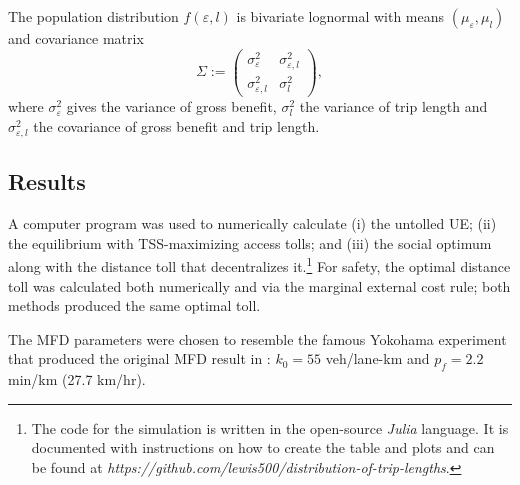 \documentclass[preprint,authoryear]{elsarticle}
\newcommand{\ve}{\varepsilon}
\begin{document}
The population distribution $f(\ve,l)$ is bivariate lognormal with means $(\mu_\ve, \mu_l)$ and covariance matrix 
$$
\Sigma := \begin{pmatrix}
	\sigma^2_\ve & \sigma^2_{\ve,l} \\
	\sigma^2_{\ve,l} & \sigma^2_l
\end{pmatrix},
$$
where $\sigma^2_\ve$ gives the variance of gross benefit, $\sigma^2_l$ the variance of trip length and $\sigma^2_{\ve,l}$ the covariance of gross benefit and trip length.

\subsection{Results}
\label{ssec:results}

A computer program was used to numerically calculate (i) the untolled UE; (ii) the equilibrium with TSS-maximizing access tolls; and (iii) the social optimum along with the distance toll that decentralizes it.\footnote{The code for the simulation is written in the open-source \emph{Julia} language. It is documented with instructions on how to create the table and plots and can be found at \emph{https://github.com/lewis500/distribution-of-trip-lengths}.} For safety, the optimal distance toll was calculated both numerically and via the marginal external cost rule; both methods produced the same optimal toll.

The MFD parameters were chosen to resemble the famous Yokohama experiment that produced the original MFD result in \citet{Geroliminis2008}: $k_0 = 55$ veh/lane-km and $p_f=2.2$ min/km (27.7 km/hr).
\end{document}
